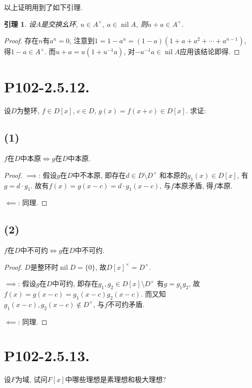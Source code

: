 \documentclass[12pt, a4paper, fontset=windows]{ctexart}
\newcommand{\nil}{\operatorname{nil}}
\newcommand{\unit}[1]{{#1}^\times}
\newtheorem*{lemma}{引理}
\begin{document}
以上证明用到了如下引理. 

\begin{lemma}
设$A$是交换幺环, $u\in\unit{A}$, $a\in\nil A$, 则$u+a\in\unit{A}$. 
\end{lemma}

\begin{proof}
存在$n$有$a^n=0$, 注意到$1=1-a^n=(1-a)(1+a+a^2+\cdots+a^{n-1})$, 
得$1-a\in\unit{A}$. 而$u+a=u(1+u^{-1}a)$, 对$-u^{-1}a\in\nil A$应用该结论即得. 
\end{proof}

\section*{P102-2.5.12.}

设$D$为整环, $f\in D[x]$, $c\in D$, $g(x)=f(x+c)\in D[x]$. 求证: 

\subsection*{(1)}

$f$在$D$中本原$\iff g$在$D$中本原. 

\begin{proof}
$\implies$: 假设$g$在$D$中不本原, 即存在$d\in D\setminus\unit{D}$
和本原的$g_1(x)\in D[x]$, 有$g=d\cdot g_1$. 
故有$f(x)=g(x-c)=d\cdot g_1(x-c)$, 与$f$本原矛盾, 得$f$本原. 

$\impliedby$: 同理. 
\end{proof}

\subsection*{(2)}

$f$在$D$中不可约$\iff g$在$D$中不可约. 

\begin{proof}
$D$是整环时$\nil D=\{0\}$, 故$\unit{D[x]}=\unit{D}$. 

$\implies$: 假设$g$在$D$中可约, 即存在$g_1,g_2\in D[x]\setminus\unit{D}$
有$g=g_1g_2$, 故$f(x)=g(x-c)=g_1(x-c)g_2(x-c)$. 
而又知$g_1(x-c),g_2(x-c)\notin\unit{D}$, 与$f$不可约矛盾. 

$\impliedby$: 同理. 
\end{proof}

\section*{P102-2.5.13.}

设$F$为域, 试问$F[x]$中哪些理想是素理想和极大理想? 
\end{document}
